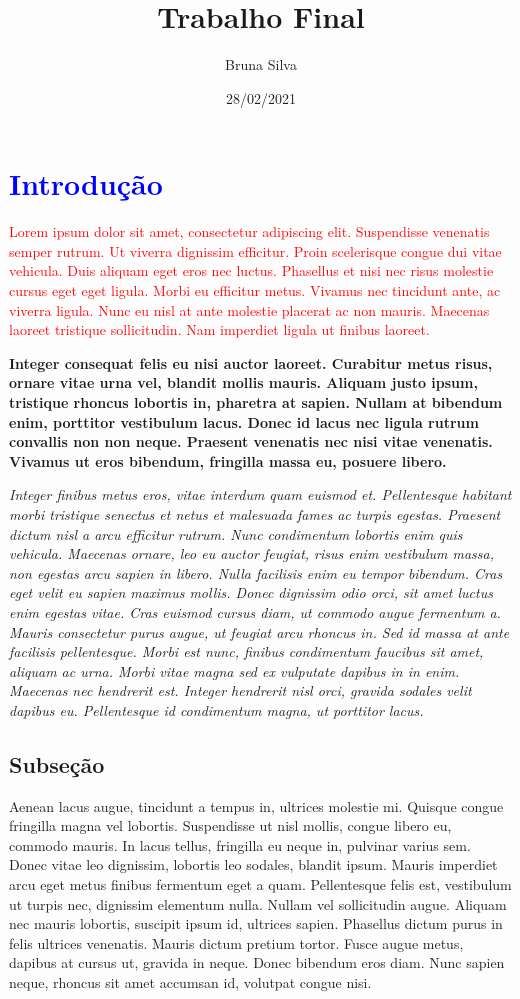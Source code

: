 \documentclass{article}
\title{Trabalho Final}
\author{Bruna Silva}
\date{28/02/2021}
\begin{document}
\maketitle

\section{\textcolor{blue}{Introdução}}
\noindent
\textcolor{red}{Lorem ipsum dolor sit amet, consectetur adipiscing elit. Suspendisse venenatis
semper rutrum. Ut viverra dignissim efficitur. Proin scelerisque congue dui
vitae vehicula. Duis aliquam eget eros nec luctus. Phasellus et nisi nec risus
molestie cursus eget eget ligula. Morbi eu efficitur metus. Vivamus nec tincidunt
ante, ac viverra ligula. Nunc eu nisl at ante molestie placerat ac non mauris.
Maecenas laoreet tristique sollicitudin. Nam imperdiet ligula ut finibus laoreet.
}

\textbf{Integer consequat felis eu nisi auctor laoreet. Curabitur metus
risus, ornare vitae urna vel, blandit mollis mauris. Aliquam justo
ipsum, tristique rhoncus lobortis in, pharetra at sapien. Nullam at
bibendum enim, porttitor vestibulum lacus. Donec id lacus nec ligula
rutrum convallis non non neque. Praesent venenatis nec nisi vitae
venenatis. Vivamus ut eros bibendum, fringilla massa eu, posuere
libero.}

\textit{Integer finibus metus eros, vitae interdum quam euismod et. Pellentesque
habitant morbi tristique senectus et netus et malesuada fames ac turpis egestas.
Praesent dictum nisl a arcu efficitur rutrum. Nunc condimentum lobortis enim
quis vehicula. Maecenas ornare, leo eu auctor feugiat, risus enim vestibulum
massa, non egestas arcu sapien in libero. Nulla facilisis enim eu tempor bibendum. Cras eget velit eu sapien maximus mollis. Donec dignissim odio orci, sit
amet luctus enim egestas vitae. Cras euismod cursus diam, ut commodo augue
fermentum a. Mauris consectetur purus augue, ut feugiat arcu rhoncus in. Sed
id massa at ante facilisis pellentesque. Morbi est nunc, finibus condimentum
faucibus sit amet, aliquam ac urna. Morbi vitae magna sed ex vulputate dapibus
in in enim. Maecenas nec hendrerit est. Integer hendrerit nisl orci, gravida sodales velit dapibus eu. Pellentesque id condimentum magna, ut porttitor lacus.
}

\subsection{Subseção}
Aenean lacus augue, tincidunt a tempus in, ultrices molestie mi. Quisque congue
fringilla magna vel lobortis. Suspendisse ut nisl mollis, congue libero eu, commodo mauris. In lacus tellus, fringilla eu neque in, pulvinar varius sem. Donec
vitae leo dignissim, lobortis leo sodales, blandit ipsum. Mauris imperdiet arcu
eget metus finibus fermentum eget a quam. Pellentesque felis est, vestibulum ut turpis nec, dignissim elementum nulla. Nullam vel sollicitudin augue. Aliquam
nec mauris lobortis, suscipit ipsum id, ultrices sapien. Phasellus dictum purus
in felis ultrices venenatis. Mauris dictum pretium tortor. Fusce augue metus,
dapibus at cursus ut, gravida in neque. Donec bibendum eros diam. Nunc
sapien neque, rhoncus sit amet accumsan id, volutpat congue nisi.
\end{document}
